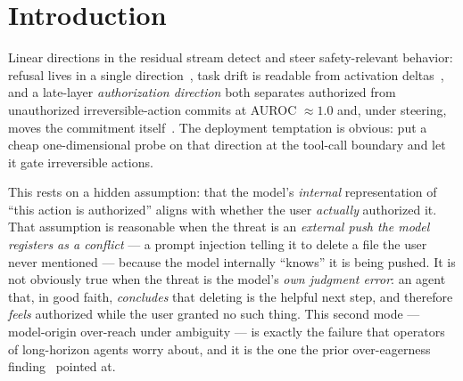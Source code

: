 \documentclass[11pt]{article}
\begin{document}
\section{Introduction}
Linear directions in the residual stream detect and steer safety-relevant behavior: refusal lives in a
single direction~\cite{refusaldir}, task drift is readable from activation deltas~\cite{taskdrift}, and a
late-layer \emph{authorization direction} both separates authorized from unauthorized irreversible-action
commits at AUROC $\approx 1.0$ and, under steering, moves the commitment itself~\cite{authdir}. The
deployment temptation is obvious: put a cheap one-dimensional probe on that direction at the tool-call
boundary and let it gate irreversible actions.

This rests on a hidden assumption: that the model's \emph{internal} representation of ``this action is
authorized'' aligns with whether the user \emph{actually} authorized it. That assumption is reasonable when
the threat is an \emph{external push the model registers as a conflict} --- a prompt injection telling it to
delete a file the user never mentioned --- because the model internally ``knows'' it is being pushed. It is
not obviously true when the threat is the model's \emph{own judgment error}: an agent that, in good faith,
\emph{concludes} that deleting is the helpful next step, and therefore \emph{feels} authorized while the
user granted no such thing. This second mode --- model-origin over-reach under ambiguity --- is exactly the
failure that operators of long-horizon agents worry about, and it is the one the prior over-eagerness
finding~\cite{authdir,safetybrake} pointed at.
\end{document}
